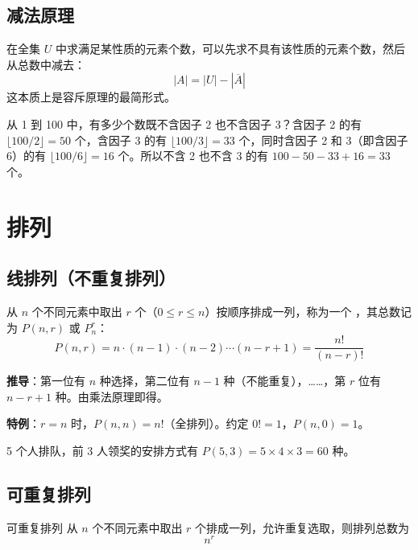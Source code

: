 \subsection{减法原理}

在全集 $U$ 中求满足某性质的元素个数，可以先求不具有该性质的元素个数，然后从总数中减去：
\[
|A| = |U| - |\overline{A}|
\]
这本质上是容斥原理的最简形式。

\begin{example}
从 1 到 100 中，有多少个数既不含因子 2 也不含因子 3？含因子 2 的有 $\lfloor 100/2 \rfloor = 50$ 个，含因子 3 的有 $\lfloor 100/3 \rfloor = 33$ 个，同时含因子 2 和 3（即含因子 6）的有 $\lfloor 100/6 \rfloor = 16$ 个。所以不含 2 也不含 3 的有 $100 - 50 - 33 + 16 = 33$ 个。
\end{example}

\section{排列}

\subsection{线排列（不重复排列）}

\begin{mydefinition}{}
从 $n$ 个不同元素中取出 $r$ 个（$0 \leq r \leq n$）按顺序排成一列，称为一个 ，其总数记为 $P(n, r)$ 或 $P_n^r$：
\[
P(n, r) = n \cdot (n-1) \cdot (n-2) \cdots (n-r+1) = \frac{n!}{(n-r)!}
\]
\end{mydefinition}

\textbf{推导}：第一位有 $n$ 种选择，第二位有 $n-1$ 种（不能重复），……，第 $r$ 位有 $n-r+1$ 种。由乘法原理即得。

\textbf{特例}：$r = n$ 时，$P(n, n) = n!$（全排列）。约定 $0! = 1$，$P(n, 0) = 1$。

\begin{example}
5 个人排队，前 3 人领奖的安排方式有 $P(5, 3) = 5 \times 4 \times 3 = 60$ 种。
\end{example}

\subsection{可重复排列}

\begin{myTheorem}{可重复排列}
从 $n$ 个不同元素中取出 $r$ 个排成一列，允许重复选取，则排列总数为
\[
n^r
\]
\end{myTheorem}

